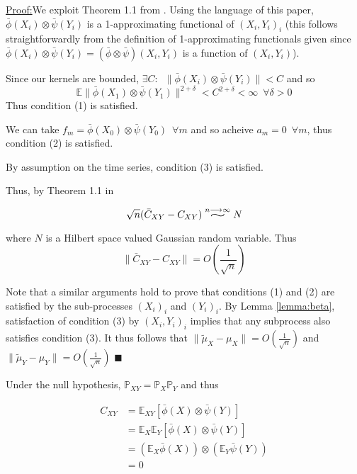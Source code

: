 \documentclass[12pt]{article}
\newcommand{\widesim}[2][1.5]{
  \mathrel{\overset{#2}{\scalebox{#1}[1]{$\sim$}}}
}
\newenvironment{claimproof}[1]{\par\noindent\underline{Proof:}\space#1}{\hfill $\blacksquare$}
\numberwithin{claim}{section}
\numberwithin{lemma}{section}
\numberwithin{theorem}{section}
\begin{document}
\begin{claimproof}
We exploit Theorem 1.1 from \cite{dehling2015bootstrap}. Using the language of this paper, ${\bar{\phi}(X_i)\otimes\bar{\psi}(Y_i)}$ is a 1-approximating functional of $(X_i,Y_i)_i$ (this follows straightforwardly from the definition of 1-approximating functionals given since $\bar{\phi}(X_i)\otimes\bar{\psi}(Y_i) = (\bar{\phi}\otimes\bar{\psi})(X_i,Y_i)$ is a function of $(X_i,Y_i)$). 

Since our kernels are bounded, $\exists C: \enspace \|\bar{\phi}(X_i)\otimes\bar{\psi}(Y_i)\| < C $ and so \[\mathbb{E}\|\bar{\phi}(X_1)\otimes\bar{\psi}(Y_1)\|^{2+\delta} <C^{2+\delta}< \infty \enspace \forall \delta>0\]
Thus condition (1) is satisfied.

We can take $f_m = \bar{\phi}(X_0)\otimes\bar{\psi}(Y_0) \enspace \forall m$ and so acheive $a_m= 0 \enspace \forall m$, thus condition (2) is satisfied.

By assumption on the time series, condition (3) is satisfied.

Thus, by Theorem 1.1 in \cite{dehling2015bootstrap}

\[\sqrt{n} (\bar{C}_{XY} - C_{XY}) \widesim[2]{n\longrightarrow\infty} N\]


where $N$ is a Hilbert space valued Gaussian random variable. Thus 
\[\|\bar{C}_{XY} - C_{XY}\| = O(\frac{1}{\sqrt{n}})\]

Note that a similar arguments hold to prove that conditions (1) and (2) are satisfied by the sub-processes $(X_i)_i$ and $(Y_i)_i$. By Lemma \ref{lemma:beta}, satisfaction of condition (3) by $(X_i,Y_i)_i$ implies that any subprocess also satisfies condition (3). It thus follows that $\| \tilde{\mu}_X  - \mu_X \|  = O(\frac{1}{\sqrt{n}})$ and $\| \tilde{\mu}_Y  - \mu_Y \|  = O(\frac{1}{\sqrt{n}})$
\end{claimproof}


Under the null hypothesis, $\mathbb{P}_{XY} = \mathbb{P}_{X}\mathbb{P}_{Y}$ and thus

\begin{align*}
C_{XY} & = \mathbb{E}_{XY}[ \bar{\phi}(X) \otimes \bar{\psi}(Y)]\\
&= \mathbb{E}_{X}\mathbb{E}_{Y}[ \bar{\phi}(X) \otimes \bar{\psi}(Y)]\\
&= (\mathbb{E}_{X}\bar{\phi}(X)) \otimes (\mathbb{E}_{Y}\bar{\psi}(Y))\\
&= 0\\
\end{align*}
\end{document}

